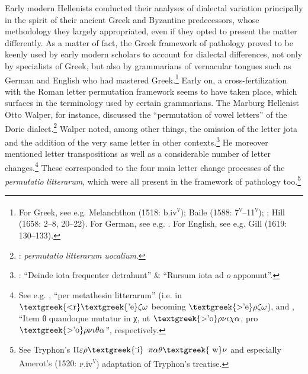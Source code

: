 Early modern Hellenists conducted their analyses of dialectal variation principally in the spirit of their ancient Greek and Byzantine predecessors, whose methodology they largely appropriated, even if they opted to present the matter differently. As a matter of fact, the Greek framework of pathology proved to be keenly used by early modern scholars to account for dialectal differences, not only by specialists of Greek, but also by grammarians of vernacular tongues such as German and English who had mastered Greek.\footnote{ \textrm{For Greek, see e.g. Melanchthon (1518: b.iv}\textrm{\textsc{\textsuperscript{v}}}\textrm{); Baile (1588: 7}\textrm{\textsc{\textsuperscript{v}}}\textrm{–11}\textrm{\textsc{\textsuperscript{v}}}\textrm{); \citet[11]{Schmidt1604}; Hill (1658: 2–8, 20–22). For German, see e.g. \citet{Wolf1578}. For English, see e.g. Gill (1619: 130–133).}} Early on, a cross-fertilization with the Roman letter permutation framework seems to have taken place, which surfaces in the terminology used by certain grammarians. The Marburg Hellenist Otto Walper, for instance, discussed the “permutation of vowel letters” of the Doric dialect.\footnote{ \textrm{\citet[62]{Walper1589}:} \textrm{\textit{permutatio} \textit{litterarum} \textit{uocalium}}.} Walper noted, among other things, the omission of the letter jota and the addition of the very same letter in other contexts.\footnote{ \textrm{\citet[63]{Walper1589}: “Deinde iota frequenter detrahunt” \& “Rursum iota ad $o$ apponunt”.}} He moreover mentioned letter transpositions as well as a considerable number of letter changes.\footnote{ \textrm{See e.g. \citet[63]{Walper1589}, “per metathesin litterarum” (i.e. in $\text{\textgreek{<r}}\text{\textgreek{'e}}\zeta \omega $ becoming $\text{\textgreek{>'e}}\rho \zeta \omega $), and \citet[64]{Walper1589}, “Item θ quandoque mutatur in χ, ut $\text{\textgreek{>'o}}\rho \nu \iota \chi \alpha $, pro $\text{\textgreek{>'o}}\rho \nu \iota \theta \alpha $”, respectively.}} These corresponded to the four main letter change processes of the \textit{permutatio} \textit{litterarum}, which were all present in the framework of pathology too.\footnote{ \textrm{See Tryphon’s $\Pi \varepsilon \rho \text{\textgreek{`i}}$ $\pi \alpha \theta \text{\textgreek{~w}}\nu $ and especially Amerot’s (1520:} \textrm{\textsc{p.}}\textrm{iv}\textrm{\textsc{\textsuperscript{v}}}\textrm{)} \textrm{adaptation of Tryphon’s treatise.}}

